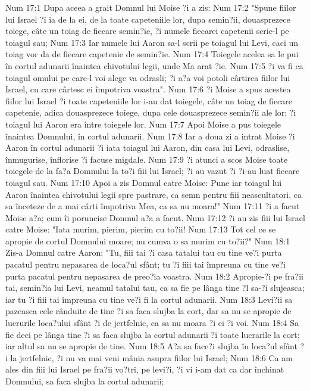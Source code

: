 Num 17:1  Dupa aceea a grait Domnul lui Moise ?i a zis:
Num 17:2  "Spune fiilor lui Israel ?i ia de la ei, de la toate capeteniile lor, dupa semin?ii, douasprezece toiege, câte un toiag de fiecare semin?ie, ?i numele fiecarei capetenii scrie-l pe toiagul sau;
Num 17:3  Iar numele lui Aaron sa-l scrii pe toiagul lui Levi, caci un toiag vor da de fiecare capetenie de semin?ie.
Num 17:4  Toiegele acelea sa le pui în cortul adunarii înaintea chivotului legii, unde Ma arat ?ie.
Num 17:5  ?i va fi ca toiagul omului pe care-l voi alege va odrasli; ?i a?a voi potoli cârtirea fiilor lui Israel, cu care cârtesc ei împotriva voastra".
Num 17:6  ?i Moise a spus acestea fiilor lui Israel ?i toate capeteniile lor i-au dat toiegele, câte un toiag de fiecare capetenie, adica douasprezece toiege, dupa cele douasprezece semin?ii ale lor; ?i toiagul lui Aaron era între toiegele lor.
Num 17:7  Apoi Moise a pus toiegele înaintea Domnului, în cortul adunarii.
Num 17:8  Iar a doua zi a intrat Moise ?i Aaron în cortul adunarii ?i iata toiagul lui Aaron, din casa lui Levi, odraslise, înmugurise, înflorise ?i facuse migdale.
Num 17:9  ?i atunci a scos Moise toate toiegele de la fa?a Domnului la to?i fiii lui Israel; ?i au vazut ?i ?i-au luat fiecare toiagul sau.
Num 17:10  Apoi a zis Domnul catre Moise: Pune iar toiagul lui Aaron înaintea chivotului legii spre pastrare, ca semn pentru fiii neascultatori, ca sa înceteze de a mai cârti împotriva Mea, ca sa nu moara!"
Num 17:11  ?i a facut Moise a?a; cum îi poruncise Domnul a?a a facut.
Num 17:12  ?i au zis fiii lui Israel catre Moise: "Iata murim, pierim, pierim cu to?ii!
Num 17:13  Tot cel ce se apropie de cortul Domnului moare; nu cumva o sa murim cu to?ii?"
Num 18:1  Zis-a Domnul catre Aaron: "Tu, fiii tai ?i casa tatalui tau cu tine ve?i purta pacatul pentru nepasarea de loca?ul sfânt; tu ?i fiii tai împreuna cu tine ve?i purta pacatul pentru nepasarea de preo?ia voastra.
Num 18:2  Apropie-?i pe fra?ii tai, semin?ia lui Levi, neamul tatalui tau, ca sa fie pe lânga tine ?l sa-?i slujeasca; iar tu ?i fiii tai împreuna cu tine ve?i fi la cortul adunarii.
Num 18:3  Levi?ii sa pazeasca cele rânduite de tine ?i sa faca slujba la cort, dar sa nu se apropie de lucrurile loca?ului sfânt ?i de jertfelnic, ca sa nu moara ?i ei ?i voi.
Num 18:4  Sa fie deci pe lânga tine ?i sa faca slujba la cortul adunarii ?i toate lucrarile la cort; iar altul sa nu se apropie de tine.
Num 18:5  A?a sa face?i slujba în loca?ul sfânt ?i la jertfelnic, ?i nu va mai veni mânia asupra fiilor lui Israel;
Num 18:6  Ca am ales din fiii lui Israel pe fra?ii vo?tri, pe levi?i, ?i vi i-am dat ca dar închinat Domnului, sa faca slujba la cortul adunarii;
